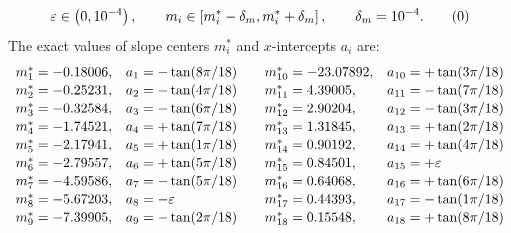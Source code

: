 \providecommand{\SeedNineteenEpsLower}{10^{-12}}
\providecommand{\SeedNineteenEpsUpper}{10^{-4}}
\providecommand{\SeedNineteenDeltaM}{10^{-4}}
\label{eq:seed19-parameter-box}
\[
  \eps \in \left(0,\SeedNineteenEpsUpper\right),
  \qquad
  m_i \in \left[m_i^\ast-\delta_m,m_i^\ast+\delta_m\right],
  \qquad
  \delta_m = \SeedNineteenDeltaM.
  \tag{\theequation}
\]
The exact values of slope centers $m_i^\ast$ and $x$-intercepts $a_i$ are:
\begingroup
\[
\renewcommand{\arraystretch}{1.1}
\begin{array}{ll@{\qquad}ll}
 m_{1}^\ast = -0.18006, & a_{1} = -\tan(8\pi/18) & m_{10}^\ast = -23.07892, & a_{10} = +\tan(3\pi/18) \\
 m_{2}^\ast = -0.25231, & a_{2} = -\tan(4\pi/18) & m_{11}^\ast = 4.39005, & a_{11} = -\tan(7\pi/18) \\
 m_{3}^\ast = -0.32584, & a_{3} = -\tan(6\pi/18) & m_{12}^\ast = 2.90204, & a_{12} = -\tan(3\pi/18) \\
 m_{4}^\ast = -1.74521, & a_{4} = +\tan(7\pi/18) & m_{13}^\ast = 1.31845, & a_{13} = +\tan(2\pi/18) \\
 m_{5}^\ast = -2.17941, & a_{5} = +\tan(1\pi/18) & m_{14}^\ast = 0.90192, & a_{14} = +\tan(4\pi/18) \\
 m_{6}^\ast = -2.79557, & a_{6} = +\tan(5\pi/18) & m_{15}^\ast = 0.84501, & a_{15} = +\eps \\
 m_{7}^\ast = -4.59586, & a_{7} = -\tan(5\pi/18) & m_{16}^\ast = 0.64068, & a_{16} = +\tan(6\pi/18) \\
 m_{8}^\ast = -5.67203, & a_{8} = -\eps & m_{17}^\ast = 0.44393, & a_{17} = -\tan(1\pi/18) \\
 m_{9}^\ast = -7.39905, & a_{9} = -\tan(2\pi/18) & m_{18}^\ast = 0.15548, & a_{18} = +\tan(8\pi/18) \\
\end{array}
\]
\endgroup
